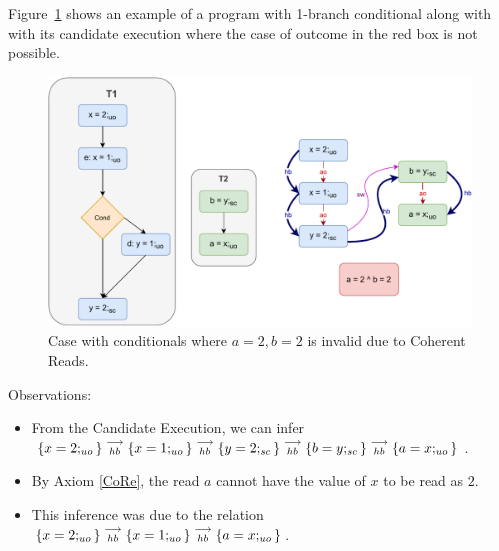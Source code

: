     Figure~\ref{reord:cond_counter_example2(a)} shows an example of a program with 1-branch conditional along with with its candidate execution where the case of outcome in the red box is not possible. 
    \begin{figure}[H]
        \centering 
        \includegraphics[scale=0.7]{5.InstructionReordering/5.ValidReorderingProgram/CounterExamples2a(Conditionals).pdf}
        \caption{Case with conditionals where $a = 2, b = 2$ is invalid due to Coherent Reads.}
        \label{reord:cond_counter_example2(a)}
    \end{figure}
    
    Observations:
    \begin{itemize}
        \item From the Candidate Execution, we can infer $\{x=2;_{uo}\}\stackrel{\longrightarrow}{_{hb}}\{x=1;_{uo}\}\stackrel{\longrightarrow}{_{hb}}\{y=2;_{sc}\}\stackrel{\longrightarrow}{_{hb}}\{b=y;_{sc}\}\stackrel{\longrightarrow}{_{hb}}\{a=x;_{uo}\}$.
        \item By Axiom \ref{CoRe}, the read $a$ cannot have the value of $x$ to be read as $2$.  
        \item This inference was due to the relation $\{x=2;_{uo}\}\stackrel{\longrightarrow}{_{hb}}\{x=1;_{uo}\}\stackrel{\longrightarrow}{_{hb}}\{a=x;_{uo}\}$.
    \end{itemize}
    
